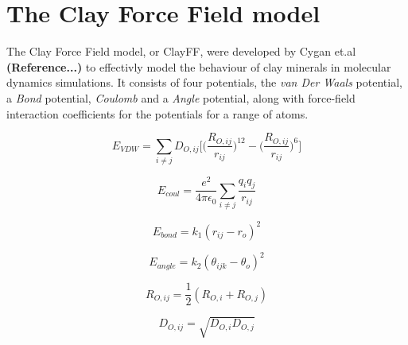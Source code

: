 \documentclass[twoside,english]{uiofysmaster}
\begin{document}
\section{The Clay Force Field model}

The Clay Force Field model, or ClayFF, were developed by Cygan et.al \textbf{(Reference...)} to effectivly model the behaviour of clay minerals in molecular dynamics simulations. It consists of four potentials, the \textit{van Der Waals} potential, a \textit{Bond} potential, \textit{Coulomb} and a \textit{Angle} potential, along with force-field interaction coefficients for the potentials for a range of atoms.

\begin{equation}
E_{VDW} = \sum _{i\neq j} D_{O,ij}\Big[ \Big( \frac{R_{O,ij}}{r_{ij}} \Big) ^{12} - \Big( \frac{R_{O,ij}}{r_{ij}} \Big) ^{6} \Big]
\end{equation}

\begin{equation}
E_{coul} = \frac{e^2}{4\pi \epsilon _0}\sum _{i\neq j} \frac{q_i q_j}{r_{ij}}
\end{equation}

\begin{equation}
E_{bond} = k_1(r_{ij}-r_o)^2
\end{equation}

\begin{equation}
E_{angle} = k_2(\theta _{ijk} - \theta _o)^2
\end{equation}

\begin{equation}
R_{O,ij} = \frac{1}{2}(R_{O,i} + R_{O,j})
\end{equation}

\begin{equation}
D_{O,ij} = \sqrt{D_{O,i}D_{O,j}}
\end{equation}
\end{document}
